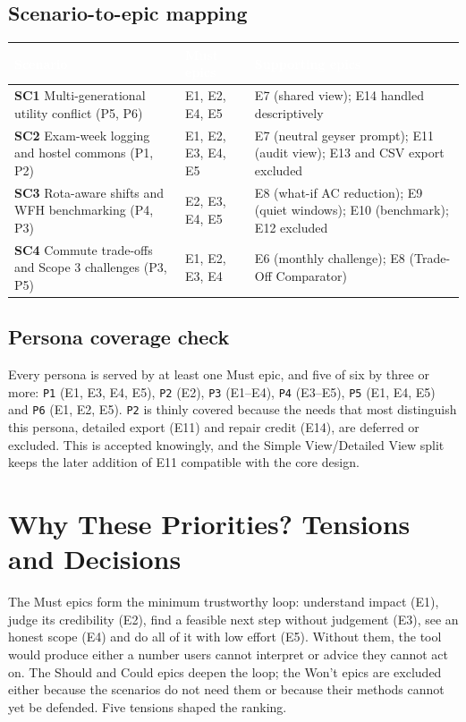 \documentclass[12pt, a4paper]{article}
\begin{document}
\subsection{Scenario-to-epic mapping}
{\footnotesize
{}
\begin{longtable}{|>{\raggedright\arraybackslash}p{5.2cm}|>{\raggedright\arraybackslash}p{4.4cm}|>{\raggedright\arraybackslash}p{6.0cm}|}
\hline
\rowcolor{cNavy}
\textcolor{white}{\textbf{Scenario}} & \textcolor{white}{\textbf{Must epics}} & \textcolor{white}{\textbf{Supporting epics}} \\
\hline
\endhead
\hline
\endfoot
\textbf{SC1} Multi-generational utility conflict (P5, P6) & E1, E2, E4, E5 & E7 (shared view); E14 handled descriptively \\
\hline
\textbf{SC2} Exam-week logging and hostel commons (P1, P2) & E1, E2, E3, E4, E5 & E7 (neutral geyser prompt); E11 (audit view); E13 and CSV export excluded \\
\hline
\textbf{SC3} Rota-aware shifts and WFH benchmarking (P4, P3) & E2, E3, E4, E5 & E8 (what-if AC reduction); E9 (quiet windows); E10 (benchmark); E12 excluded \\
\hline
\textbf{SC4} Commute trade-offs and Scope 3 challenges (P3, P5) & E1, E2, E3, E4 & E6 (monthly challenge); E8 (Trade-Off Comparator) \\
\hline
\end{longtable}
}

\subsection{Persona coverage check}
Every persona is served by at least one Must epic, and five of six by three or more: \texttt{P1} (E1, E3, E4, E5), \texttt{P2} (E2), \texttt{P3} (E1--E4), \texttt{P4} (E3--E5), \texttt{P5} (E1, E4, E5) and \texttt{P6} (E1, E2, E5). \texttt{P2} is thinly covered because the needs that most distinguish this persona, detailed export (E11) and repair credit (E14), are deferred or excluded. This is accepted knowingly, and the Simple View/Detailed View split keeps the later addition of E11 compatible with the core design.

\section{Why These Priorities? Tensions and Decisions}
The Must epics form the minimum trustworthy loop: understand impact (E1), judge its credibility (E2), find a feasible next step without judgement (E3), see an honest scope (E4) and do all of it with low effort (E5). Without them, the tool would produce either a number users cannot interpret or advice they cannot act on. The Should and Could epics deepen the loop; the Won't epics are excluded either because the scenarios do not need them or because their methods cannot yet be defended. Five tensions shaped the ranking.
\end{document}
